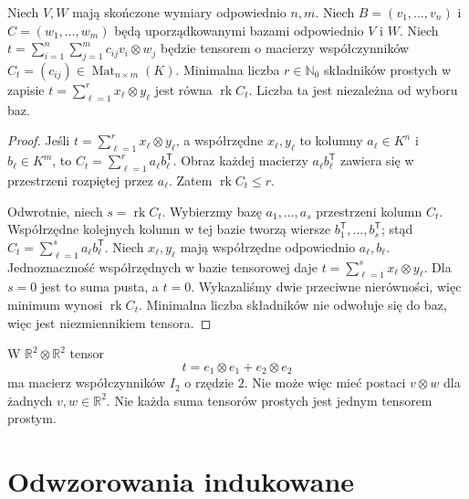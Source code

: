\begin{twierdzenie}
\label{thm:lin10-rzad}
Niech \(V,W\) mają skończone
wymiary odpowiednio \(n,m\).
Niech \(B=(v_1,\ldots,v_n)\)
i \(C=(w_1,\ldots,w_m)\)
będą uporządkowanymi bazami
odpowiednio \(V\) i \(W\).
Niech
\(t=\sum_{i=1}^{n}\sum_{j=1}^{m}
 c_{ij}v_i\otimes w_j\)
będzie tensorem o macierzy
współczynników
\(C_t=(c_{ij})\in\operatorname{Mat}_{n\times m}(K)\).
Minimalna liczba \(r\in\mathbb N_0\)
składników prostych w zapisie
\(t=\sum_{\ell=1}^r x_\ell\otimes y_\ell\)
jest równa \(\operatorname{rk}C_t\).
Liczba ta jest niezależna
od wyboru baz.
\end{twierdzenie}
\begin{proof}
Jeśli \(t=\sum_{\ell=1}^r
x_\ell\otimes y_\ell\),
a współrzędne \(x_\ell,y_\ell\)
to kolumny \(a_\ell\in K^n\)
i \(b_\ell\in K^m\), to
\(C_t=\sum_{\ell=1}^r
a_\ell b_\ell^{\mathsf T}\).
Obraz każdej macierzy
\(a_\ell b_\ell^{\mathsf T}\)
zawiera się w przestrzeni
rozpiętej przez \(a_\ell\).
Zatem \(\operatorname{rk}C_t\leq r\).

Odwrotnie, niech
\(s=\operatorname{rk}C_t\).
Wybierzmy bazę
\(a_1,\ldots,a_s\)
przestrzeni kolumn \(C_t\).
Współrzędne kolejnych kolumn
w tej bazie tworzą wiersze
\(b_1^{\mathsf T},\ldots,b_s^{\mathsf T}\);
stąd
\(C_t=\sum_{\ell=1}^s
a_\ell b_\ell^{\mathsf T}\).
Niech \(x_\ell,y_\ell\)
mają współrzędne odpowiednio
\(a_\ell,b_\ell\).
Jednoznaczność współrzędnych
w bazie tensorowej daje
\(t=\sum_{\ell=1}^s x_\ell\otimes y_\ell\).
Dla \(s=0\) jest to suma pusta,
a \(t=0\).
Wykazaliśmy dwie przeciwne
nierówności, więc minimum wynosi
\(\operatorname{rk}C_t\).
Minimalna liczba składników
nie odwołuje się do baz,
więc jest niezmiennikiem tensora.
\end{proof}

\begin{przyklad}
\label{prz:lin10-nieprosty}
W \(\mathbb R^2\otimes\mathbb R^2\)
tensor
\[
 t=e_1\otimes e_1+e_2\otimes e_2
\]
ma macierz współczynników \(I_2\)
o rzędzie \(2\).
Nie może więc mieć postaci
\(v\otimes w\) dla żadnych
\(v,w\in\mathbb R^2\).
Nie każda suma tensorów prostych
jest jednym tensorem prostym.
\end{przyklad}

\section{Odwzorowania indukowane}
\label{sec:lin10-mapy}

